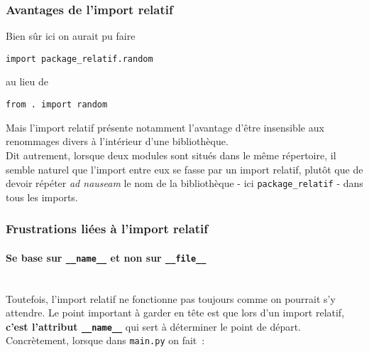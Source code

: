     \hypertarget{avantages-de-limport-relatif}{%
\subsubsection{Avantages de l'import
relatif}\label{avantages-de-limport-relatif}}

    Bien sûr ici on aurait pu faire

\begin{verbatim}
import package_relatif.random
\end{verbatim}

au lieu de

\begin{verbatim}
from . import random
\end{verbatim}

    Mais l'import relatif présente notamment l'avantage d'être insensible
aux renommages divers à l'intérieur d'une bibliothèque.\\

    Dit autrement, lorsque deux modules sont situés dans le même répertoire,
il semble naturel que l'import entre eux se fasse par un import relatif,
plutôt que de devoir répéter \emph{ad nauseam} le nom de la bibliothèque
- ici \texttt{package\_relatif} - dans tous les imports.

    \hypertarget{frustrations-liuxe9es-uxe0-limport-relatif}{%
\subsubsection{Frustrations liées à l'import
relatif}\label{frustrations-liuxe9es-uxe0-limport-relatif}}

    \hypertarget{se-base-sur-__name__-et-non-sur-__file__}{%
\paragraph{\texorpdfstring{Se base sur \texttt{\_\_name\_\_} et non sur
\texttt{\_\_file\_\_}\\\\}{Se base sur \_\_name\_\_ et non sur \_\_file\_\_}}\label{se-base-sur-__name__-et-non-sur-__file__}}

    Toutefois, l'import relatif ne fonctionne pas toujours comme on pourrait
s'y attendre. Le point important à garder en tête est que lors d'un
import relatif, \textbf{c'est l'attribut \texttt{\_\_name\_\_}} qui sert
à déterminer le point de départ.\\

    Concrètement, lorsque dans \texttt{main.py} on fait~:

